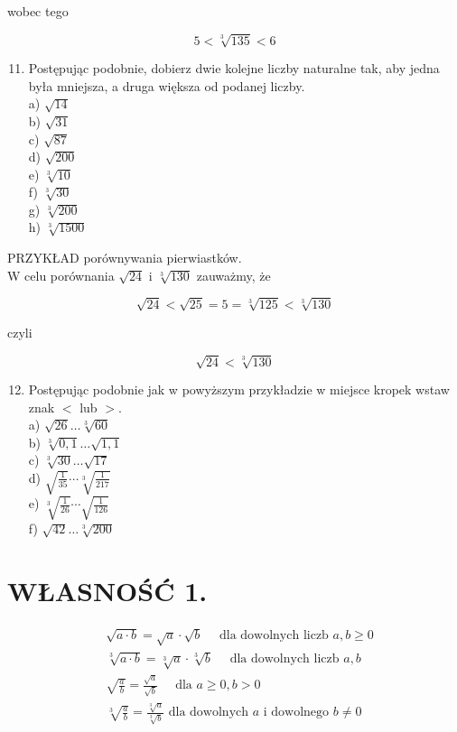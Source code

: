\documentclass[10pt]{article}
\begin{document}
wobec tego

\[
5<\sqrt[3]{135}<6
\]

\begin{enumerate}
  \setcounter{enumi}{10}
  \item Postępując podobnie, dobierz dwie kolejne liczby naturalne tak, aby jedna była mniejsza, a druga większa od podanej liczby.\\
a) \(\sqrt{14}\)\\
b) \(\sqrt{31}\)\\
c) \(\sqrt{87}\)\\
d) \(\sqrt{200}\)\\
e) \(\sqrt[3]{10}\)\\
f) \(\sqrt[3]{30}\)\\
g) \(\sqrt[3]{200}\)\\
h) \(\sqrt[3]{1500}\)
\end{enumerate}

PRZYKŁAD porównywania pierwiastków.\\
W celu porównania \(\sqrt{24}\) i \(\sqrt[3]{130}\) zauważmy, że

\[
\sqrt{24}<\sqrt{25}=5=\sqrt[3]{125}<\sqrt[3]{130}
\]

czyli

\[
\sqrt{24}<\sqrt[3]{130}
\]

\begin{enumerate}
  \setcounter{enumi}{11}
  \item Postępując podobnie jak w powyższym przykładzie w miejsce kropek wstaw znak \(<\) lub \(>\).\\
a) \(\sqrt{26} \ldots \sqrt[3]{60}\)\\
b) \(\sqrt[3]{0,1} \ldots \sqrt{1,1}\)\\
c) \(\sqrt[3]{30} \ldots \sqrt{17}\)\\
d) \(\sqrt{\frac{1}{35}} \cdots \sqrt[3]{\frac{1}{217}}\)\\
e) \(\sqrt[3]{\frac{1}{26}} \cdots \sqrt{\frac{1}{126}}\)\\
f) \(\sqrt{42} \ldots \sqrt[3]{200}\)
\end{enumerate}

\section*{WŁASNOŚĆ 1.}
\[
\begin{aligned}
& \sqrt{a \cdot b}=\sqrt{a} \cdot \sqrt{b} \quad \text { dla dowolnych liczb } a, b \geqslant 0 \\
& \sqrt[3]{a \cdot b}=\sqrt[3]{a} \cdot \sqrt[3]{b} \quad \text { dla dowolnych liczb } a, b \\
& \sqrt{\frac{a}{b}}=\frac{\sqrt{a}}{\sqrt{b}} \quad \text { dla } a \geqslant 0, b>0 \\
& \sqrt[3]{\frac{a}{b}}=\frac{\sqrt[3]{a}}{\sqrt[3]{b}} \text { dla dowolnych } a \text { i dowolnego } b \neq 0
\end{aligned}
\]
\end{document}
